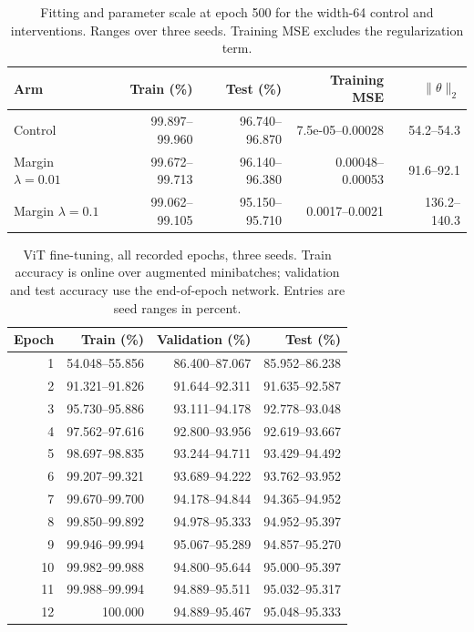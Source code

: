 \FloatBarrier
\begin{table}[!htbp]\centering
\caption{Fitting and parameter scale at epoch 500 for the width-64 control and interventions. Ranges over three seeds. Training MSE excludes the regularization term.}\label{tab:perf-controlled-scale}
\small\begin{tabular}{lrrrr}\toprule
Arm & Train (\%) & Test (\%) & Training MSE & $\|\theta\|_2$\\\midrule
Control & 99.897--99.960 & 96.740--96.870 & 7.5e-05--0.00028 & 54.2--54.3\\
Margin $\lambda=0.01$ & 99.672--99.713 & 96.140--96.380 & 0.00048--0.00053 & 91.6--92.1\\
Margin $\lambda=0.1$ & 99.062--99.105 & 95.150--95.710 & 0.0017--0.0021 & 136.2--140.3\\
\bottomrule\end{tabular}\end{table}
\FloatBarrier
\begin{table}[!htbp]\centering
\caption{ViT fine-tuning, all recorded epochs, three seeds. Train accuracy is online over augmented minibatches; validation and test accuracy use the end-of-epoch network. Entries are seed ranges in percent.}\label{tab:perf-native-history}
\small\begin{tabular}{rrrr}\toprule
Epoch & Train (\%) & Validation (\%) & Test (\%)\\\midrule
1 & 54.048--55.856 & 86.400--87.067 & 85.952--86.238\\
2 & 91.321--91.826 & 91.644--92.311 & 91.635--92.587\\
3 & 95.730--95.886 & 93.111--94.178 & 92.778--93.048\\
4 & 97.562--97.616 & 92.800--93.956 & 92.619--93.667\\
5 & 98.697--98.835 & 93.244--94.711 & 93.429--94.492\\
6 & 99.207--99.321 & 93.689--94.222 & 93.762--93.952\\
7 & 99.670--99.700 & 94.178--94.844 & 94.365--94.952\\
8 & 99.850--99.892 & 94.978--95.333 & 94.952--95.397\\
9 & 99.946--99.994 & 95.067--95.289 & 94.857--95.270\\
10 & 99.982--99.988 & 94.800--95.644 & 95.000--95.397\\
11 & 99.988--99.994 & 94.889--95.511 & 95.032--95.317\\
12 & 100.000 & 94.889--95.467 & 95.048--95.333\\
\bottomrule\end{tabular}\end{table}

